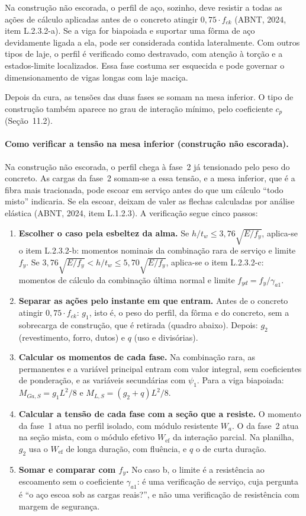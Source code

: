 \documentclass[11pt,a4paper]{article}
\begin{document}
Na construção não escorada, o perfil de aço, sozinho, deve resistir a todas as ações de cálculo aplicadas antes de o concreto atingir $0{,}75\cdot f_{ck}$ (ABNT, 2024, item L.2.3.2-a). Se a viga for biapoiada e suportar uma fôrma de aço devidamente ligada a ela, pode ser considerada contida lateralmente. Com outros tipos de laje, o perfil é verificado como destravado, com atenção à torção e a estados-limite localizados. Essa fase costuma ser esquecida e pode governar o dimensionamento de vigas longas com laje maciça.

Depois da cura, as tensões das duas fases se somam na mesa inferior. O tipo de construção também aparece no grau de interação mínimo, pelo coeficiente $c_p$ (Seção~11.2).

\paragraph{Como verificar a tensão na mesa inferior (construção não escorada).}
Na construção não escorada, o perfil chega à fase~2 já tensionado pelo peso do concreto. As cargas da fase~2 somam-se a essa tensão, e a mesa inferior, que é a fibra mais tracionada, pode escoar em serviço antes do que um cálculo ``todo misto'' indicaria. Se ela escoar, deixam de valer as flechas calculadas por análise elástica (ABNT, 2024, item L.1.2.3). A verificação segue cinco passos:
\begin{enumerate}
  \item \textbf{Escolher o caso pela esbeltez da alma.} Se $h/t_w \le 3{,}76\sqrt{E/f_y}$, aplica-se o item L.2.3.2-b: momentos nominais da combinação rara de serviço e limite $f_y$. Se $3{,}76\sqrt{E/f_y} < h/t_w \le 5{,}70\sqrt{E/f_y}$, aplica-se o item L.2.3.2-c: momentos de cálculo da combinação última normal e limite $f_{yd} = f_y/\gamma_{a1}$.
  \item \textbf{Separar as ações pelo instante em que entram.} Antes de o concreto atingir $0{,}75\cdot f_{ck}$: $g_1$, isto é, o peso do perfil, da fôrma e do concreto, sem a sobrecarga de construção, que é retirada (quadro abaixo). Depois: $g_2$ (revestimento, forro, dutos) e $q$ (uso e divisórias).
  \item \textbf{Calcular os momentos de cada fase.} Na combinação rara, as permanentes e a variável principal entram com valor integral, sem coeficientes de ponderação, e as variáveis secundárias com $\psi_1$. Para a viga biapoiada: $M_{Ga,S} = g_1 L^2/8$ e $M_{L,S} = (g_2 + q) L^2/8$.
  \item \textbf{Calcular a tensão de cada fase com a seção que a resiste.} O momento da fase~1 atua no perfil isolado, com módulo resistente $W_a$. O da fase~2 atua na seção mista, com o módulo efetivo $W_{\text{ef}}$ da interação parcial. Na planilha, $g_2$ usa o $W_{\text{ef}}$ de longa duração, com fluência, e $q$ o de curta duração.
  \item \textbf{Somar e comparar com $f_y$.} No caso b, o limite é a resistência ao escoamento sem o coeficiente $\gamma_{a1}$: é uma verificação de serviço, cuja pergunta é ``o aço escoa sob as cargas reais?'', e não uma verificação de resistência com margem de segurança.
\end{enumerate}
\end{document}
